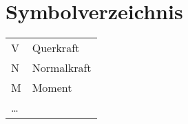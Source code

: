 
\chapter*{Symbolverzeichnis}

\begin{tabular}{ll}
	V		& Querkraft\\
	N		& Normalkraft\\
	M	 	& Moment \\

	\dots
\end{tabular}
